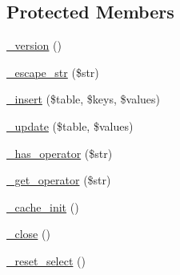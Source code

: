 \subsection*{Protected Members}
\begin{DoxyCompactItemize}
\item 
\mbox{\hyperlink{class_c_i___d_b__driver_ac997a462bb342f97f414910f0e033fb6}{\+\_\+version}} ()
\item 
\mbox{\hyperlink{class_c_i___d_b__driver_af8ef0237bfcdb19215b63fff769e7a55}{\+\_\+escape\+\_\+str}} (\$str)
\item 
\mbox{\hyperlink{class_c_i___d_b__driver_a69ee76b136052e0a8f06097fb388e53e}{\+\_\+insert}} (\$table, \$keys, \$values)
\item 
\mbox{\hyperlink{class_c_i___d_b__driver_a2540b03a93fa73ae74c10d0e16fc073e}{\+\_\+update}} (\$table, \$values)
\item 
\mbox{\hyperlink{class_c_i___d_b__driver_a2e0ab20a3cd2941eaa854fe0b4a81e6b}{\+\_\+has\+\_\+operator}} (\$str)
\item 
\mbox{\hyperlink{class_c_i___d_b__driver_af932ab30583179e70fa44f91dc9c5b4d}{\+\_\+get\+\_\+operator}} (\$str)
\item 
\mbox{\hyperlink{class_c_i___d_b__driver_a3991c9b589034f12f6fed26d83ac47e4}{\+\_\+cache\+\_\+init}} ()
\item 
\mbox{\hyperlink{class_c_i___d_b__driver_a4d9082658000e5ede8312067c6dda9db}{\+\_\+close}} ()
\item 
\mbox{\hyperlink{class_c_i___d_b__driver_a7c6cc16411b9c36fbfd42a9317f64317}{\+\_\+reset\+\_\+select}} ()
\end{DoxyCompactItemize}
